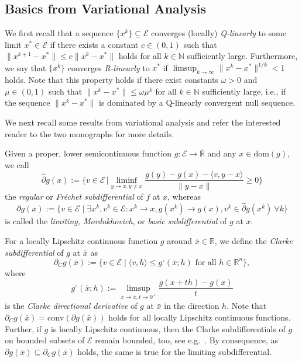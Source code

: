 \documentclass[a4paper, 12pt]{article}
\numberwithin{equation}{section}
\theoremstyle{bolddef}
\theoremstyle{definition}
\theoremstyle{boldplain}
\newcommand{\xk}{x^k}
\newcommand{\xkp}{x^{k+1}}
\newcommand{\barR}{\overline{\mathbb{R}}}
\newcommand{\N}{\mathbb{N}}
\newcommand{\X}{\mathcal{E}}
\newcommand{\dom}{\mathrm{dom}}
\begin{document}
\subsection{Basics from Variational Analysis}

We first recall that a sequence $ \{ \xk \} \subseteq \X $
converges (locally) \emph{Q-linearly} to some limit 
$ x^* \in \X $ if there exists a constant $ c \in (0,1) $ 
such that  $\| \xkp - x^* \| \leq c \| \xk - x^* \|$
holds for all $ k \in \N $ sufficiently large. Furthermore,
we say that $ \{ \xk \} $ converges \emph{R-linearly} to $ x^* $ if
$\limsup_{k \to \infty} \| \xk - x^* \|^{1/k} < 1 $
holds. Note that this property holds if there exist constants
$ \omega > 0 $ and $ \mu \in (0,1) $ such that $ \| \xk - x^* \| \leq 
\omega \mu^k $ for all $ k \in \N $ sufficiently large, i.e.,
if the sequence $ \| \xk - x^* \| $ is dominated by a Q-linearly
convergent null sequence.

We next recall some results from variational analysis and refer the
interested reader to the two monographs \cite{Mordukhovich2018,RockafellarWets2009}
for more details.

Given a proper, lower semicontinuous function $ g: \X \to
\barR $ and any $ x \in \dom (g) $, we call 
\begin{equation*}
	\hat\partial g(x) := \Big\{ v \in \X \, \Big|
	\liminf_{y \to x, y \neq x} \frac{g(y) - g(x) - 
	\langle v, y-x \rangle}{\| y- x \|} \geq 0 \Big\}
\end{equation*}
the \emph{regular} or \emph{Fr\'echet subdifferential} of $ f $ at $ x $, 
whereas
\begin{equation*}
	\partial g(x) := \big\{ v \in \X \mid 
	\exists \xk,  v^k \in \X : \xk \to x, g(\xk) \to g(x),
	v^k \in \hat\partial g(\xk) \ \forall k \big\}
\end{equation*}
is called the \emph{limiting, Mordukhovich}, or 
\emph{basic subdifferential}
of $ g $ at $ x $. 

For a locally Lipschitz continuous function $g$ around $\bar x \in \mathbb{R}$, we define the \emph{Clarke subdifferential} of $g$ at $\bar x $ as 
\begin{equation*}
	\partial_C g(\bar x):= \{ v \in \X \mid \langle v, h \rangle \leq g^\circ (\bar x; h) \text{ for all } h \in \mathbb{R}^n\},
\end{equation*}
where
\begin{equation*}
	g^\circ(\bar x; h) := \limsup_{x \to \bar x, t \to 0^+} \frac{g(x+th) - g(x)}{t}
\end{equation*}
is the \emph{Clarke directional derivative} of $g$ at $\bar x$ in the direction $h$. Note that $\partial_C g(\bar x) = \mathrm{conv}(\partial g(\bar x))$ holds for all locally Lipschitz continuous functions. Further, if $g$ is locally Lipschitz continuous, then the Clarke subdifferentials of $g$ on bounded subsets of $\X$ remain bounded, too, see e.g.\ \cite{clarke1998}. By consequence, as $\partial g(\bar x) \subseteq \partial_C g(\bar x)$ holds, the same is true for the limiting subdifferential.
\end{document}
